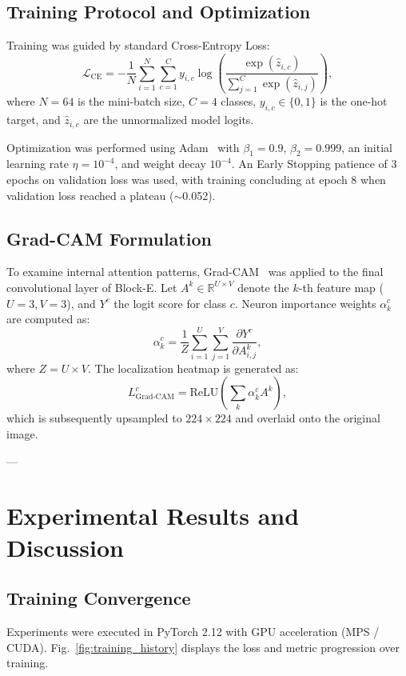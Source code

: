\documentclass[conference]{IEEEtran}
\begin{document}
\subsection{Training Protocol and Optimization}
Training was guided by standard Cross-Entropy Loss:
\begin{equation}
\mathcal{L}_{\text{CE}} = -\frac{1}{N}\sum_{i=1}^N \sum_{c=1}^C y_{i,c} \log \left(\frac{\exp(\hat{z}_{i,c})}{\sum_{j=1}^C \exp(\hat{z}_{i,j})}\right),
\end{equation}
where $N=64$ is the mini-batch size, $C=4$ classes, $y_{i,c} \in \{0, 1\}$ is the one-hot target, and $\hat{z}_{i,c}$ are the unnormalized model logits.

Optimization was performed using Adam~\cite{kingma2014adam} with $\beta_1 = 0.9$, $\beta_2 = 0.999$, an initial learning rate $\eta = 10^{-4}$, and weight decay $10^{-4}$. An Early Stopping patience of 3 epochs on validation loss was used, with training concluding at epoch 8 when validation loss reached a plateau ($\sim$0.052).

\subsection{Grad-CAM Formulation}
To examine internal attention patterns, Grad-CAM~\cite{selvaraju2017grad} was applied to the final convolutional layer of Block-E. Let $A^k \in \mathbb{R}^{U \times V}$ denote the $k$-th feature map ($U=3, V=3$), and $Y^c$ the logit score for class $c$. Neuron importance weights $\alpha_k^c$ are computed as:
\begin{equation}
\alpha_k^c = \frac{1}{Z}\sum_{i=1}^U \sum_{j=1}^V \frac{\partial Y^c}{\partial A_{i,j}^k},
\end{equation}
where $Z = U \times V$. The localization heatmap is generated as:
\begin{equation}
L_{\text{Grad-CAM}}^c = \text{ReLU}\left(\sum_k \alpha_k^c A^k\right),
\end{equation}
which is subsequently upsampled to $224 \times 224$ and overlaid onto the original image.

---

\section{Experimental Results and Discussion}

\subsection{Training Convergence}
Experiments were executed in PyTorch 2.12 with GPU acceleration (MPS / CUDA). Fig.~\ref{fig:training_history} displays the loss and metric progression over training.
\end{document}
